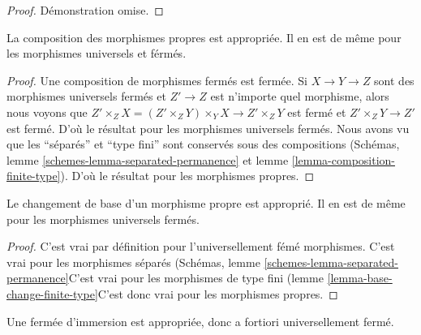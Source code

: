 \begin{proof}
Démonstration omise.
\end{proof}

\begin{lemma}

\label{lemma-composition-proper}

La composition des morphismes propres est appropriée. Il en est de même pour les morphismes universels et férmés.

\end{lemma}

\begin{proof}
Une composition de morphismes fermés est fermée. Si $X \to Y \to Z$ sont des morphismes universels fermés et $Z' \to Z$ est n'importe quel morphisme, alors nous voyons que $Z' \times_Z X = (Z' \times_Z Y) \times_Y X  \to Z' \times_Z Y$ est fermé et $Z' \times_Z Y \to Z'$ est fermé. D'où le résultat pour les morphismes universels fermés. Nous avons vu que les ``séparés'' et ``type fini'' sont conservés sous des compositions (Schémas, lemme \ref{schemes-lemma-separated-permanence} et lemme \ref{lemma-composition-finite-type}). D'où le résultat pour les morphismes propres.
\end{proof}

\begin{lemma}

\label{lemma-base-change-proper}

Le changement de base d'un morphisme propre est approprié. Il en est de même pour les morphismes universels fermés.

\end{lemma}

\begin{proof}

C'est vrai par définition pour l'universellement fémé morphismes. C'est vrai pour les morphismes séparés (Schémas, lemme \ref{schemes-lemma-separated-permanence}C'est vrai pour les morphismes de type fini (lemme \ref{lemma-base-change-finite-type}C'est donc vrai pour les morphismes propres.

\end{proof}

\begin{lemma}

\label{lemma-closed-immersion-proper}

Une fermée d'immersion est appropriée, donc a fortiori universellement fermé.

\end{lemma}

